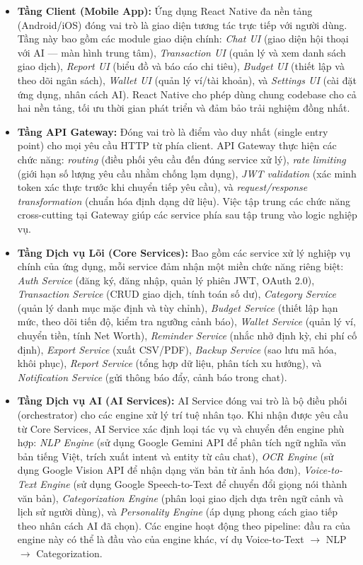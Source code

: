 \begin{itemize}
    \item \textbf{Tầng Client (Mobile App):} Ứng dụng React Native đa nền tảng (Android/iOS) đóng vai trò là giao diện tương tác trực tiếp với người dùng. Tầng này bao gồm các module giao diện chính: \textit{Chat UI} (giao diện hội thoại với AI --- màn hình trung tâm), \textit{Transaction UI} (quản lý và xem danh sách giao dịch), \textit{Report UI} (biểu đồ và báo cáo chi tiêu), \textit{Budget UI} (thiết lập và theo dõi ngân sách), \textit{Wallet UI} (quản lý ví/tài khoản), và \textit{Settings UI} (cài đặt ứng dụng, nhân cách AI). React Native cho phép dùng chung codebase cho cả hai nền tảng, tối ưu thời gian phát triển và đảm bảo trải nghiệm đồng nhất.

    \item \textbf{Tầng API Gateway:} Đóng vai trò là điểm vào duy nhất (single entry point) cho mọi yêu cầu HTTP từ phía client. API Gateway thực hiện các chức năng: \textit{routing} (điều phối yêu cầu đến đúng service xử lý), \textit{rate limiting} (giới hạn số lượng yêu cầu nhằm chống lạm dụng), \textit{JWT validation} (xác minh token xác thực trước khi chuyển tiếp yêu cầu), và \textit{request/response transformation} (chuẩn hóa định dạng dữ liệu). Việc tập trung các chức năng cross-cutting tại Gateway giúp các service phía sau tập trung vào logic nghiệp vụ.

    \item \textbf{Tầng Dịch vụ Lõi (Core Services):} Bao gồm các service xử lý nghiệp vụ chính của ứng dụng, mỗi service đảm nhận một miền chức năng riêng biệt: \textit{Auth Service} (đăng ký, đăng nhập, quản lý phiên JWT, OAuth 2.0), \textit{Transaction Service} (CRUD giao dịch, tính toán số dư), \textit{Category Service} (quản lý danh mục mặc định và tùy chỉnh), \textit{Budget Service} (thiết lập hạn mức, theo dõi tiến độ, kiểm tra ngưỡng cảnh báo), \textit{Wallet Service} (quản lý ví, chuyển tiền, tính Net Worth), \textit{Reminder Service} (nhắc nhở định kỳ, chi phí cố định), \textit{Export Service} (xuất CSV/PDF), \textit{Backup Service} (sao lưu mã hóa, khôi phục), \textit{Report Service} (tổng hợp dữ liệu, phân tích xu hướng), và \textit{Notification Service} (gửi thông báo đẩy, cảnh báo trong chat).

    \item \textbf{Tầng Dịch vụ AI (AI Services):} AI Service đóng vai trò là bộ điều phối (orchestrator) cho các engine xử lý trí tuệ nhân tạo. Khi nhận được yêu cầu từ Core Services, AI Service xác định loại tác vụ và chuyển đến engine phù hợp: \textit{NLP Engine} (sử dụng Google Gemini API để phân tích ngữ nghĩa văn bản tiếng Việt, trích xuất intent và entity từ câu chat), \textit{OCR Engine} (sử dụng Google Vision API để nhận dạng văn bản từ ảnh hóa đơn), \textit{Voice-to-Text Engine} (sử dụng Google Speech-to-Text để chuyển đổi giọng nói thành văn bản), \textit{Categorization Engine} (phân loại giao dịch dựa trên ngữ cảnh và lịch sử người dùng), và \textit{Personality Engine} (áp dụng phong cách giao tiếp theo nhân cách AI đã chọn). Các engine hoạt động theo pipeline: đầu ra của engine này có thể là đầu vào của engine khác, ví dụ Voice-to-Text $\rightarrow$ NLP $\rightarrow$ Categorization.


\end{itemize}
